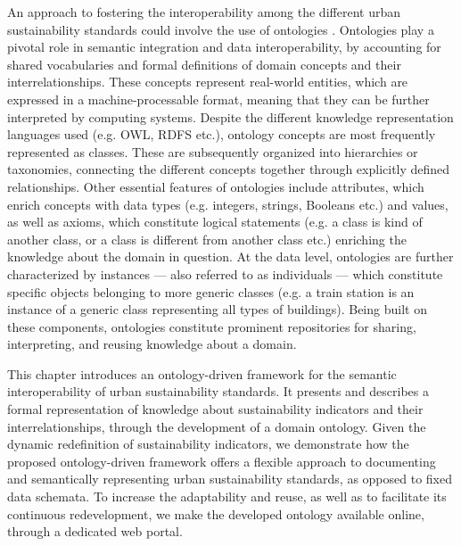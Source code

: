\documentclass[preprint,12pt]{elsarticle}
\begin{document}
An approach to fostering the interoperability among the different urban sustainability standards could involve the use of ontologies \cite{psyllidis2016dis,psyllidis2015}. Ontologies play a pivotal role in semantic integration and data interoperability, by accounting for shared vocabularies and formal definitions of domain concepts and their interrelationships. These concepts represent real-world entities, which are expressed in a machine-processable format, meaning that they can be further interpreted by computing systems. Despite the different knowledge representation languages used (e.g. OWL, RDFS etc.), ontology concepts are most frequently represented as classes. These are subsequently organized into hierarchies or taxonomies, connecting the different concepts together through explicitly defined relationships. Other essential features of ontologies include attributes, which enrich concepts with data types (e.g. integers, strings, Booleans etc.) and values, as well as axioms, which constitute logical statements (e.g. a class is kind of another class, or a class is different from another class etc.) enriching the knowledge about the domain in question.  At the data level, ontologies are further characterized by instances — also referred to as individuals — which constitute specific objects belonging to more generic classes (e.g. a train station is an instance of a generic class representing all types of buildings). Being built on these components, ontologies constitute prominent repositories for sharing, interpreting, and reusing knowledge about a domain.

This chapter introduces an ontology-driven framework for the semantic interoperability of urban sustainability standards. It presents and describes a formal representation of knowledge about sustainability indicators and their interrelationships, through the development of a domain ontology. Given the dynamic redefinition of sustainability indicators, we demonstrate how the proposed ontology-driven framework offers a flexible approach to documenting and semantically representing urban sustainability standards, as opposed to fixed data schemata.  To increase the adaptability and reuse, as well as to facilitate its continuous redevelopment, we make the developed ontology available online, through a dedicated web portal.
\end{document}

